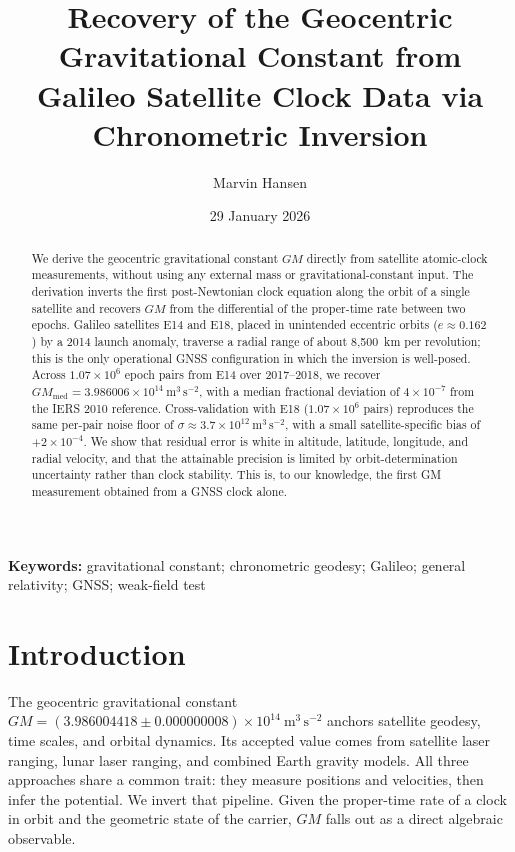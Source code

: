 \documentclass[11pt,a4paper]{article}
\title{Recovery of the Geocentric Gravitational Constant from Galileo Satellite Clock Data via Chronometric Inversion}
\author[1]{Marvin Hansen}
\affil[1]{The Center for Dynamic Causality, \texttt{marvin.hansen@causalcenter.com}}
\date{29 January 2026}
\begin{document}
\maketitle

\begin{abstract}
\noindent
We derive the geocentric gravitational constant $GM$ directly from satellite atomic-clock measurements, without using any external mass or gravitational-constant input. The derivation inverts the first post-Newtonian clock equation along the orbit of a single satellite and recovers $GM$ from the differential of the proper-time rate between two epochs. Galileo satellites E14 and E18, placed in unintended eccentric orbits ($e \approx 0.162$) by a 2014 launch anomaly, traverse a radial range of about 8,500~km per revolution; this is the only operational GNSS configuration in which the inversion is well-posed. Across $1.07 \times 10^{6}$ epoch pairs from E14 over 2017--2018, we recover $GM_\text{med} = 3.986006 \times 10^{14}~\mathrm{m^3\,s^{-2}}$, with a median fractional deviation of $4 \times 10^{-7}$ from the IERS 2010 reference. Cross-validation with E18 ($1.07 \times 10^{6}$ pairs) reproduces the same per-pair noise floor of $\sigma \approx 3.7 \times 10^{12}~\mathrm{m^3\,s^{-2}}$, with a small satellite-specific bias of $+2 \times 10^{-4}$. We show that residual error is white in altitude, latitude, longitude, and radial velocity, and that the attainable precision is limited by orbit-determination uncertainty rather than clock stability. This is, to our knowledge, the first GM measurement obtained from a GNSS clock alone.
\end{abstract}

\noindent\textbf{Keywords:} gravitational constant; chronometric geodesy; Galileo; general relativity; GNSS; weak-field test

\section{Introduction}

The geocentric gravitational constant $GM = (3.986004418 \pm 0.000000008) \times 10^{14}~\mathrm{m^3\,s^{-2}}$ \citep{IERS2010} anchors satellite geodesy, time scales, and orbital dynamics. Its accepted value comes from satellite laser ranging, lunar laser ranging, and combined Earth gravity models. All three approaches share a common trait: they measure positions and velocities, then infer the potential. We invert that pipeline. Given the proper-time rate of a clock in orbit and the geometric state of the carrier, $GM$ falls out as a direct algebraic observable.
\end{document}
